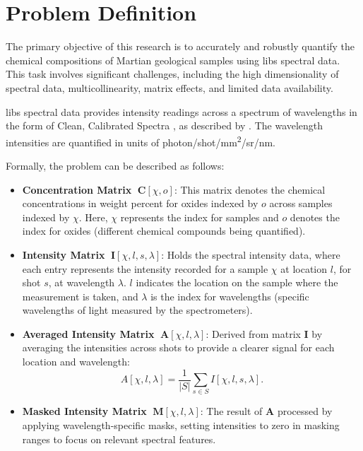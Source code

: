 \section{Problem Definition}\label{sec:problem_definition}
The primary objective of this research is to accurately and robustly quantify the chemical compositions of Martian geological samples using \gls{libs} spectral data.
This task involves significant challenges, including the high dimensionality of spectral data, multicollinearity, matrix effects, and limited data availability.

\gls{libs} spectral data provides intensity readings across a spectrum of wavelengths in the form of Clean, Calibrated Spectra \cite{andersonImprovedAccuracyQuantitative2017}, as described by \citet{wiensPreflightCalibrationInitial2013}.
The wavelength intensities are quantified in units of photon/shot/mm\textsuperscript{2}/sr/nm.

Formally, the problem can be described as follows:
\begin{itemize}[topsep=0pt]
    \item \textbf{Concentration Matrix} $\;\mathbf{C}[\chi, o]$: This matrix denotes the chemical concentrations in weight percent for oxides indexed by $o$ across samples indexed by $\chi$. Here, $\chi$ represents the index for samples and $o$ denotes the index for oxides (different chemical compounds being quantified).
    \label{matrix:concentration}

    \item \textbf{Intensity Matrix} $\;\mathbf{I}[\chi, l, s, \lambda]$: Holds the spectral intensity data, where each entry represents the intensity recorded for a sample $\chi$ at location $l$, for shot $s$, at wavelength $\lambda$. $l$ indicates the location on the sample where the measurement is taken, and $\lambda$ is the index for wavelengths (specific wavelengths of light measured by the spectrometers).
    \label{matrix:intensity}

    \item \textbf{Averaged Intensity Matrix} $\;\mathbf{A}[\chi, l, \lambda]$: Derived from matrix $\mathbf{I}$ by averaging the intensities across shots to provide a clearer signal for each location and wavelength:
    \[
    A[\chi, l, \lambda] = \frac{1}{|S|} \sum_{s \in S} I[\chi, l, s, \lambda].
    \]
    \label{matrix:averaged_intensity}

    \item \textbf{Masked Intensity Matrix} $\;\mathbf{M}[\chi, l, \lambda]$: The result of $\mathbf{A}$ processed by applying wavelength-specific masks, setting intensities to zero in masking ranges to focus on relevant spectral features.
    \label{matrix:masked_intensity}
\end{itemize}

